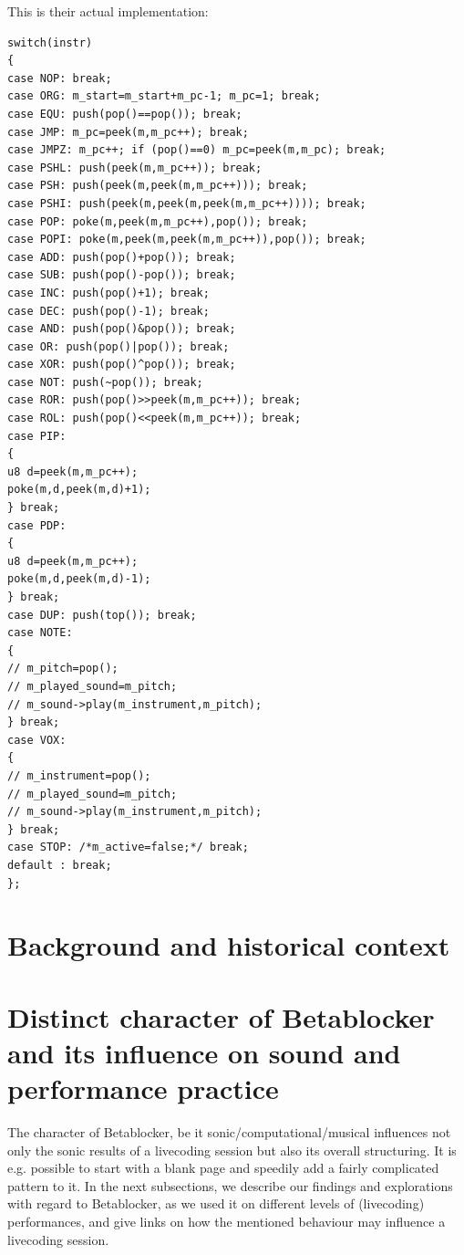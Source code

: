 \documentclass[letterpaper, 12pt]{article}
\begin{document}
This is their actual implementation:

\begin{Verbatim}[fontfamily=courier, xleftmargin=\parindent]
switch(instr)
{
case NOP: break;
case ORG: m_start=m_start+m_pc-1; m_pc=1; break;
case EQU: push(pop()==pop()); break;
case JMP: m_pc=peek(m,m_pc++); break;
case JMPZ: m_pc++; if (pop()==0) m_pc=peek(m,m_pc); break;
case PSHL: push(peek(m,m_pc++)); break;
case PSH: push(peek(m,peek(m,m_pc++))); break;
case PSHI: push(peek(m,peek(m,peek(m,m_pc++)))); break;
case POP: poke(m,peek(m,m_pc++),pop()); break;
case POPI: poke(m,peek(m,peek(m,m_pc++)),pop()); break;
case ADD: push(pop()+pop()); break;
case SUB: push(pop()-pop()); break;
case INC: push(pop()+1); break;
case DEC: push(pop()-1); break;
case AND: push(pop()&pop()); break;
case OR: push(pop()|pop()); break;
case XOR: push(pop()^pop()); break;
case NOT: push(~pop()); break;
case ROR: push(pop()>>peek(m,m_pc++)); break;
case ROL: push(pop()<<peek(m,m_pc++)); break;
case PIP:
{
u8 d=peek(m,m_pc++);
poke(m,d,peek(m,d)+1);
} break;
case PDP:
{
u8 d=peek(m,m_pc++);
poke(m,d,peek(m,d)-1);
} break;
case DUP: push(top()); break;
case NOTE:
{
// m_pitch=pop();
// m_played_sound=m_pitch;
// m_sound->play(m_instrument,m_pitch);
} break;
case VOX:
{
// m_instrument=pop();
// m_played_sound=m_pitch;
// m_sound->play(m_instrument,m_pitch);
} break;
case STOP: /*m_active=false;*/ break;
default : break;
};
\end{Verbatim}


\section{Background and historical context} 
\label{sec:background}




\section{Distinct character of Betablocker and its influence on sound and performance practice} 
\label{sec:distinct_character}


The character of Betablocker, be it sonic/computational/musical influences not only the sonic results of a livecoding session but also its overall structuring. 
It is e.g. possible to start with a blank page and speedily add a fairly complicated pattern to it.
In the next subsections, we describe our findings and explorations with regard to Betablocker, as we used it on different levels of (livecoding) performances, and give links on how the mentioned behaviour may influence a livecoding session.
\end{document}
